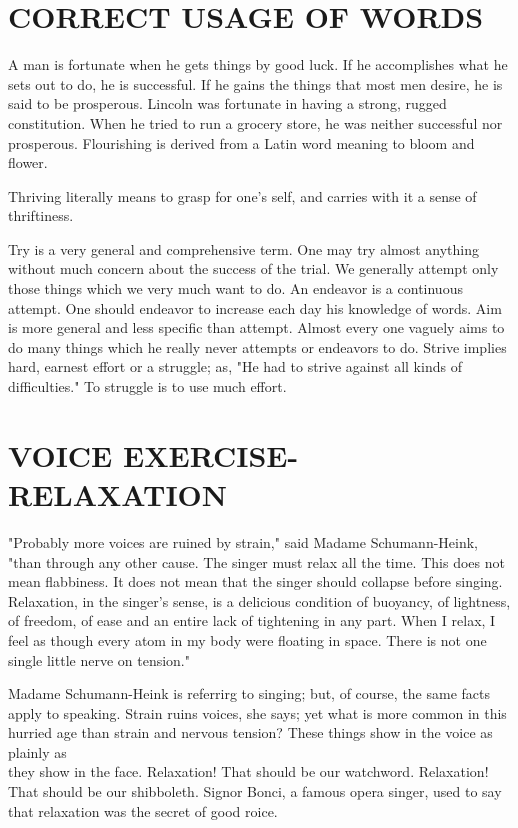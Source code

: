 \documentclass[10pt]{article}
\begin{document}
\section*{CORRECT USAGE OF WORDS}
A man is fortunate when he gets things by good luck. If he accomplishes what he sets out to do, he is successful. If he gains the things that most men desire, he is said to be prosperous. Lincoln was fortunate in having a strong, rugged constitution. When he tried to run a grocery store, he was neither successful nor prosperous. Flourishing is derived from a Latin word meaning to bloom and flower.

Thriving literally means to grasp for one's self, and carries with it a sense of thriftiness.

Try is a very general and comprehensive term. One may try almost anything without much concern about the success of the trial. We generally attempt only those things which we very much want to do. An endeavor is a continuous attempt. One should endeavor to increase each day his knowledge of words. Aim is more general and less specific than attempt. Almost every one vaguely aims to do many things which he really never attempts or endeavors to do. Strive implies hard, earnest effort or a struggle; as, "He had to strive against all kinds of difficulties." To struggle is to use much effort.

\section*{VOICE EXERCISE-RELAXATION}
"Probably more voices are ruined by strain," said Madame Schumann-Heink, "than through any other cause. The singer must relax all the time. This does not mean flabbiness. It does not mean that the singer should collapse before singing. Relaxation, in the singer's sense, is a delicious condition of buoyancy, of lightness, of freedom, of ease and an entire lack of tightening in any part. When I relax, I feel as though every atom in my body were floating in space. There is not one single little nerve on tension."

Madame Schumann-Heink is referrirg to singing; but, of course, the same facts apply to speaking. Strain ruins voices, she says; yet what is more common in this hurried age than strain and nervous tension? These things show in the voice as plainly as\\
they show in the face. Relaxation! That should be our watchword. Relaxation! That should be our shibboleth. Signor Bonci, a famous opera singer, used to say that relaxation was the secret of good roice.
\end{document}
